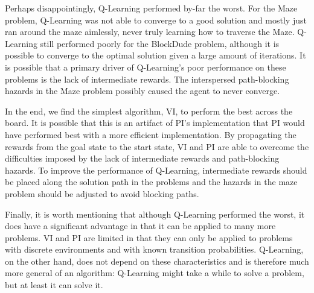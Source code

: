 \documentclass{article}
\begin{document}
Perhaps disappointingly, Q-Learning performed by-far the worst. For the Maze problem, Q-Learning was not able to
converge to a good solution and mostly just ran around the maze aimlessly, never truly learning how to traverse the Maze.
Q-Learning still performed poorly for the BlockDude problem, although it is possible to converge to the optimal solution
given a large amount of iterations. It is possible that a primary driver of Q-Learning's poor performance on these problems
is the lack of intermediate rewards. The interspersed path-blocking hazards in the Maze problem possibly caused the agent to
never converge.

In the end, we find the simplest algorithm, VI, to perform the best across the board. It is possible that this is an artifact
of PI's implementation that PI would have performed best with a more efficient implementation. By propagating the rewards from
the goal state to the start state, VI and PI are able to overcome the difficulties imposed by the lack of intermediate rewards 
and path-blocking hazards. To improve the performance of Q-Learning, intermediate rewards should be placed along the solution
path in the problems and the hazards in the maze problem should be adjusted to avoid blocking paths.

Finally, it is worth mentioning that although Q-Learning performed the worst, it does have a significant advantage in that
it can be applied to many more problems. VI and PI are limited in that they can only be applied to problems with discrete
environments and with known transition probabilities. Q-Learning, on the other hand, does not depend on these characteristics
and is therefore much more general of an algorithm: Q-Learning might take a while to solve a problem, but at least it can
solve it.
\end{document}
